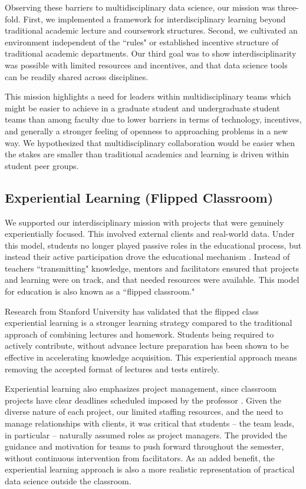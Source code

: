 \documentclass[12pt]{article}
\begin{document}
Observing these barriers to multidisciplinary data science, our mission was three-fold. First, we implemented a framework for interdisciplinary learning beyond traditional academic lecture and coursework structures. Second, we cultivated an environment independent of the ``rules" or established incentive structure of traditional academic departments. Our third goal was to show interdisciplinarity was possible with limited resources and incentives, and that data science tools can be readily shared across disciplines. 

This mission highlights a need for leaders within multidisciplinary teams which might be easier to achieve in a graduate student and undergraduate student teams than among faculty due to lower barriers in terms of technology, incentives, and generally a stronger feeling of openness to approaching problems in a new way. We hypothesized that multidisciplinary collaboration would be easier when the stakes are smaller than traditional academics and learning is driven within student peer groups.

\subsection{Experiential Learning (Flipped Classroom)}

We supported our interdisciplinary mission with projects that were genuinely experientially focused.  This involved external clients and real-world data. Under this model, students no longer played passive roles in the educational process, but instead their active participation drove the educational mechanism \citep{beard2010experiential}. Instead of teachers ``transmitting" knowledge, mentors and facilitators ensured that projects and learning were on track, and that needed resources were available. This model for education is also known as a ``flipped classroom."

Research from Stanford University \citep{plotnikoff_classes_2013} has validated that the flipped class experiential learning is a stronger learning strategy compared to the traditional approach of combining lectures and homework. Students being required to actively contribute, without advance lecture preparation has been shown to be effective in accelerating knowledge acquisition. This experiential approach means removing the accepted format of lectures and tests entirely. 

Experiential learning also emphasizes project management, since classroom projects have clear deadlines scheduled imposed by the professor \citep{mok2014teaching}. Given the diverse nature of each project, our limited staffing resources, and the need to manage relationships with clients, it was critical that students -- the team leads, in particular -- naturally assumed roles as project managers.  The provided the guidance and motivation for teams to push forward throughout the semester, without continuous intervention from facilitators. As an added benefit, the experiential learning approach is also a more realistic representation of practical data science outside the classroom.
\end{document}
